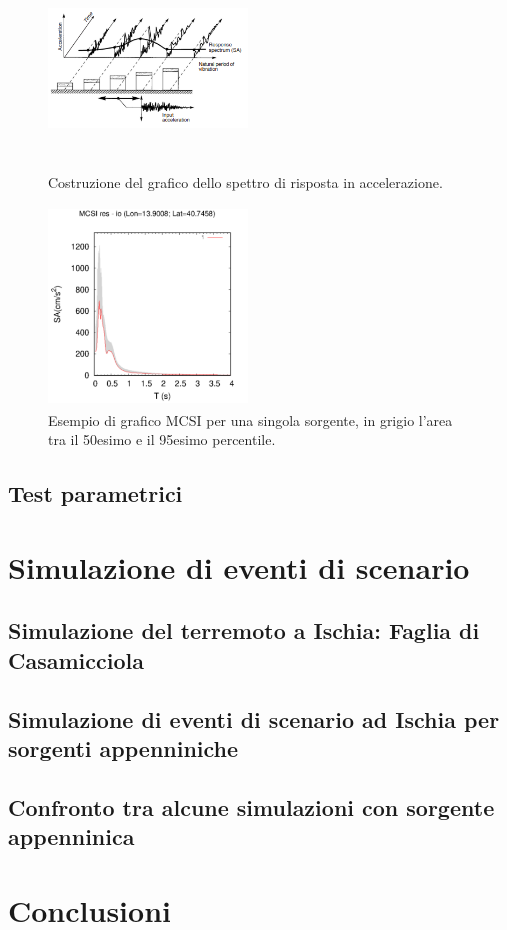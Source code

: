 \documentclass[a4paper,12pt,titlepage]{article}
\begin{document}
\begin{figure}[htbp]%
 \centering
 \includegraphics[width = 150pt, height =150pt]{Img/oscillatori.png}
 \caption{Costruzione del grafico dello spettro di risposta in accelerazione.}
 \label{fig:oscillatori}
\end{figure}

\begin{figure}[htbp]%
 \centering
 \includegraphics[width = 150pt, height =150pt]{Img/MCSI.png}
 \caption{Esempio di grafico MCSI per una singola sorgente, in grigio l'area tra il 50esimo e il 95esimo percentile.}
 \label{fig:MCSI}
\end{figure}






\subsection{Test parametrici}

\section{Simulazione di eventi di scenario}
\subsection{Simulazione del terremoto a Ischia: Faglia di Casamicciola}
\subsection{ Simulazione di eventi di scenario ad Ischia per sorgenti appenniniche}
\subsection{Confronto tra alcune simulazioni con sorgente appenninica}

\section*{Conclusioni}
\end{document}
